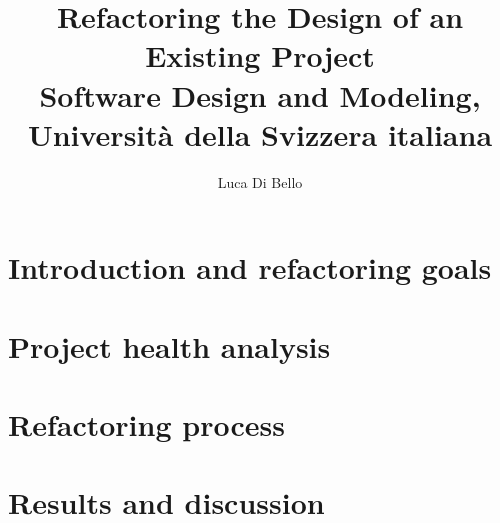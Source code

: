 \documentclass[a4paper, 11pt]{article}
\title{Refactoring the Design of an Existing Project \\\large Software Design and Modeling, Università della Svizzera italiana}
\author{Luca Di Bello}
\date{\displaydate{today}}
\begin{document}
\maketitle

\section{Introduction and refactoring goals}


\section{Project health analysis}
\label{sec:project_health_analysis}


\section{Refactoring process}
\label{sec:refactoring}


\section{Results and discussion}
\label{sec:results_conclusions}

\end{document}
